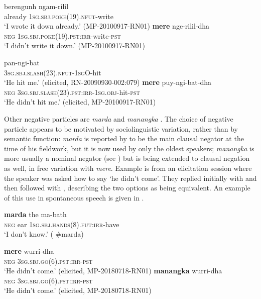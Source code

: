 \documentclass[output=paper,colorlinks,citecolor=brown]{langscibook}
\begin{document}
\ea\label{ex:mur:1}
    \ea\label{ex:mur:1a}
        \gll  berengunh ngam-rilil\\ 
              already \textsc{1sg.sbj.poke(19).nfut-}write \\
        \glt ‘I wrote it down already.’ (MP-20100917-RN01)
    \ex\label{ex:mur:1b}
        \gll  \textbf{mere} nge-rilil-dha\\
              \textsc{neg} \textsc{1sg.sbj.poke(19).pst:irr}{}-write-\textsc{pst}\\
        \glt ‘I didn't write it down.’ (MP-20100917-RN01)
    \z
\z 

\ea\label{ex:mur:2}
    \ea\label{ex:mur:2a}
        \gll  pan-ngi-bat\\ 
              \textsc{3sg.sbj.slash(23).nfut-1sgO}{}-hit\\
        \glt ‘He hit me.’ (elicited, RN-20090930-002:079)
    \ex\label{ex:mur:2b}
        \gll  \textbf{mere} puy-ngi-bat-dha\\
               \textsc{neg} \textsc{3sg.sbj.slash(23).pst:irr-1sg.obj}{}-hit-\textsc{pst}\\
        \glt ‘He didn't hit me.’ (elicited, MP-20100917-RN01)
    \z
\z 

Other negative particles are \textit{marda}  and \textit{manangka} . The choice of negative particle appears to be motivated by sociolinguistic variation, rather than by semantic function: \textit{marda} is reported by \citet[215]{Walsh1976} to be the main clausal negator at the time of his fieldwork, but it is now used by only the oldest speakers; \textit{manangka} is more usually a nominal negator (see ) but is being extended to clausal negation as well, in free variation with \textit{mere}. Example  is from an elicitation session where the speaker was asked how to say ‘he didn’t come’. They replied initially with  and then followed with , describing the two options as being equivalent. An example of this use in spontaneous speech is given in .

\ea\label{ex:mur:3}
    \gll \textbf{marda} the ma-bath\\
         \textsc{neg} ear \textsc{1sg.sbj.hands(8).fut:irr}{}-have\\
    \glt ‘I don’t know.’ (\citealt{StreetStreet1989} \#marda)
\z 

\ea\label{ex:mur:4} 
    \ea\label{ex:mur:4a}
        \gll  \textbf{mere} wurri-dha\\ 
              \textsc{neg} \textsc{3sg.sbj.go(6).pst:irr-pst}\\
        \glt ‘He didn’t come.’ (elicited, MP-20180718-RN01)
    \ex\label{ex:mur:4b}
        \gll  \textbf{manangka} wurri-dha \\
              \textsc{neg} \textsc{3sg.sbj.go(6).pst:irr-pst}\\
        \glt ‘He didn’t come.’ (elicited, MP-20180718-RN01)
    \z
\z 
\end{document}
